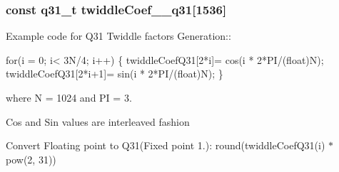\subsubsection[{\texorpdfstring{twiddle\+Coef\+\_\+1024\+\_\+q31}{twiddleCoef_1024_q31}}]{\setlength{\rightskip}{0pt plus 5cm}const q31\+\_\+t twiddle\+Coef\+\_\+\_\+q31\mbox{[}1536\mbox{]}}\hypertarget{group__CFFT__CIFFT_ga514443c44b62b8b3d240afefebcda310}{}\label{group__CFFT__CIFFT_ga514443c44b62b8b3d240afefebcda310}
\begin{DoxyParagraph}{}
Example code for Q31 Twiddle factors Generation\+:\+: 
\end{DoxyParagraph}
\begin{DoxyParagraph}{}

\begin{DoxyPre}for(i = 0; i< 3N/4; i++)
\{
   twiddleCoefQ31[2*i]= cos(i * 2*PI/(float)N);
   twiddleCoefQ31[2*i+1]= sin(i * 2*PI/(float)N);
\} \end{DoxyPre}
 
\end{DoxyParagraph}
\begin{DoxyParagraph}{}
where N = 1024 and PI = 3. 
\end{DoxyParagraph}
\begin{DoxyParagraph}{}
Cos and Sin values are interleaved fashion 
\end{DoxyParagraph}
\begin{DoxyParagraph}{}
Convert Floating point to Q31(Fixed point 1.)\+: round(twiddle\+Coef\+Q31(i) $\ast$ pow(2, 31)) 
\end{DoxyParagraph}
